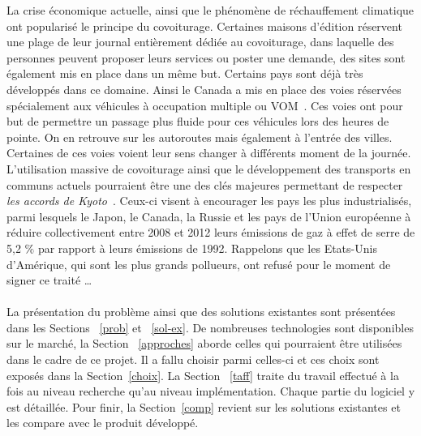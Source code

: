 \documentclass[12pt, a4paper, oneside]{article}
\begin{document}
    \indent La crise économique actuelle, ainsi que le phénomène de réchauffement climatique ont popularisé le principe du covoiturage. Certaines maisons d'édition réservent une plage de leur journal entièrement dédiée au covoiturage, dans laquelle des personnes peuvent proposer leurs services ou poster une demande, des sites sont également mis en place dans un même but. Certains pays sont déjà très développés dans ce domaine. Ainsi le Canada a mis en place des voies réservées spécialement aux véhicules à occupation multiple ou VOM~\cite{article-VOM}. Ces voies ont pour but de permettre un passage plus fluide pour ces véhicules lors des heures de pointe. On en retrouve sur les autoroutes mais également à l'entrée des villes. Certaines de ces voies voient leur sens changer à différents moment de la journée. L'utilisation massive de covoiturage ainsi que le développement des transports en communs actuels pourraient être une des clés majeures permettant de respecter \textit{les accords de Kyoto}~\cite{article-Kyoto}. Ceux-ci visent à encourager les pays les plus industrialisés, parmi lesquels le Japon, le Canada, la Russie et les pays de l'Union européenne à réduire collectivement entre 2008 et 2012 leurs émissions de gaz à effet de serre de 5,2 $\%$ par rapport à leurs émissions de 1992. Rappelons que les Etats-Unis d'Amérique, qui sont les plus grands pollueurs, ont refusé pour le moment de signer ce traité \dots\\\\
    \indent La présentation du problème ainsi que des solutions existantes sont présentées dans les Sections ~\ref{prob} et ~\ref{sol-ex}. De nombreuses technologies sont disponibles sur le marché, la Section ~\ref{approches} aborde celles qui pourraient être utilisées dans le cadre de ce projet. Il a fallu choisir parmi celles-ci et ces choix sont exposés dans la Section~\ref{choix}. La Section~ \ref{taff} traite du travail effectué à la fois au niveau recherche qu'au niveau implémentation. Chaque partie du logiciel y est détaillée. Pour finir, la Section~\ref{comp} revient sur les solutions existantes et les compare avec le produit développé.
    
\end{document}
